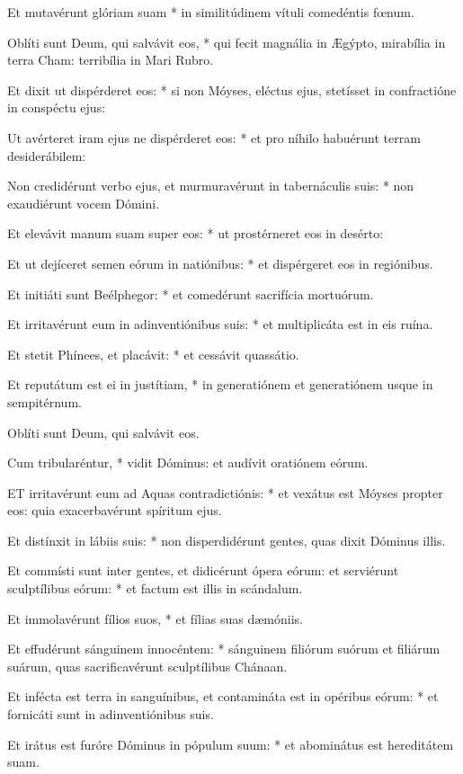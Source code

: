 Et mutavérunt glóriam suam * in similitúdinem vítuli comedéntis fœnum.

Oblíti sunt Deum, qui salvávit eos, * qui fecit magnália in Ægýpto, mirabília in terra Cham: terribília in Mari Rubro.

Et dixit ut dispérderet eos: * si non Móyses, eléctus ejus, stetísset in confractióne in conspéctu ejus:

Ut avérteret iram ejus ne dispérderet eos: * et pro níhilo habuérunt terram desiderábilem:

Non credidérunt verbo ejus, et murmuravérunt in tabernáculis suis: * non exaudiérunt vocem Dómini.

Et elevávit manum suam super eos: * ut prostérneret eos in desérto:

Et ut dejíceret semen eórum in natiónibus: * et dispérgeret eos in regiónibus.

Et initiáti sunt Beélphegor: * et comedérunt sacrifícia mortuórum.

Et irritavérunt eum in adinventiónibus suis: * et multiplicáta est in eis ruína.

Et stetit Phínees, et placávit: * et cessávit quassátio.

Et reputátum est ei in justítiam, * in generatiónem et generatiónem usque in sempitérnum.

 Oblíti sunt Deum, qui salvávit eos.

 Cum tribularéntur, * vidit Dóminus: et audívit oratiónem eórum.


\lettrine[lines=2]{E}{T} irritavérunt eum ad Aquas contradictiónis: * et vexátus est Móyses propter eos: quia exacerbavérunt spíritum ejus.

Et distínxit in lábiis suis: * non disperdidérunt gentes, quas dixit Dóminus illis.

Et commísti sunt inter gentes, et didicérunt ópera eórum: et serviérunt sculptílibus eórum: * et factum est illis in scándalum.

Et immolavérunt fílios suos, * et fílias suas dæmóniis.

Et effudérunt sánguinem innocéntem: * sánguinem filiórum suórum et filiárum suárum, quas sacrificavérunt sculptílibus Chánaan.

Et infécta est terra in sanguínibus, et contamináta est in opéribus eórum: * et fornicáti sunt in adinventiónibus suis.

Et irátus est furóre Dóminus in pópulum suum: * et abominátus est hereditátem suam.

